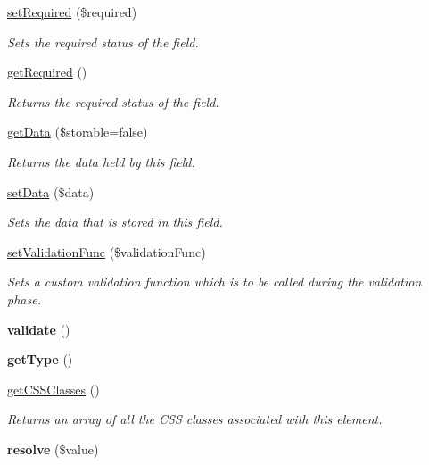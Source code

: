 \begin{DoxyCompactItemize}
\item 
\hyperlink{class_field_a8f40620a7918a1318f6dbb8b86bb5299}{setRequired} (\$required)
\begin{DoxyCompactList}\small\item\em Sets the required status of the field. \item\end{DoxyCompactList}\item 
\hyperlink{class_field_a450a2de68e1231d0d0f98b13ae81544f}{getRequired} ()
\begin{DoxyCompactList}\small\item\em Returns the required status of the field. \item\end{DoxyCompactList}\item 
\hyperlink{class_field_a8598f5a7d3772772b9620cfa7136fd4b}{getData} (\$storable=false)
\begin{DoxyCompactList}\small\item\em Returns the data held by this field. \item\end{DoxyCompactList}\item 
\hyperlink{class_field_af8e2e8df5def2245f520b44e0bcc23fd}{setData} (\$data)
\begin{DoxyCompactList}\small\item\em Sets the data that is stored in this field. \item\end{DoxyCompactList}\item 
\hyperlink{class_field_ad223f291d57a7404e9d3d220f4326c33}{setValidationFunc} (\$validationFunc)
\begin{DoxyCompactList}\small\item\em Sets a custom validation function which is to be called during the validation phase. \item\end{DoxyCompactList}\item 
\hypertarget{class_field_adb7cd75f741ef1466cc56c2a0bc8e8e1}{
{\bfseries validate} ()}
\label{class_field_adb7cd75f741ef1466cc56c2a0bc8e8e1}

\item 
\hypertarget{class_field_af5d6650254f08096046d8818d009badb}{
{\bfseries getType} ()}
\label{class_field_af5d6650254f08096046d8818d009badb}

\item 
\hyperlink{class_field_a83a6e22ab2724bf5a17f9a0024fff9df}{getCSSClasses} ()
\begin{DoxyCompactList}\small\item\em Returns an array of all the CSS classes associated with this element. \item\end{DoxyCompactList}\item 
\hypertarget{class_field_aab91508aba61d731c0ff16dc0002a1f1}{
{\bfseries resolve} (\$value)}
\label{class_field_aab91508aba61d731c0ff16dc0002a1f1}


\end{DoxyCompactItemize}
